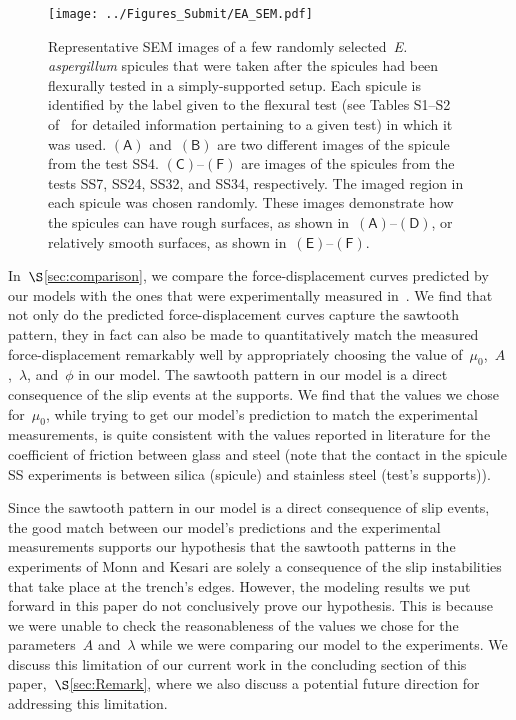 \documentclass[preprint,10pt,times]{elsarticle}
\numberwithin{equation}{section}
\newcommand{\pr}[1]{\left( #1 \right)}
\newcommand{\subf}[1]{\pr{\textsf{#1}}}
\begin{document}
\begin{figure}
\begin{centering}
\texttt{[image: ../Figures\_Submit/EA\_SEM.pdf]}
\par\end{centering}
\caption{
\label{fig:SEM}
Representative SEM images of a few
randomly selected~\textit{E. aspergillum} spicules that were taken after the spicules had been flexurally tested in a simply-supported setup. %
Each spicule is identified by the label given to the
flexural test (see Tables S1--S2 of~\cite{Sayaka2021Sawtooth} for detailed
information pertaining to a given test) in which it was used. %
$\subf{A}$ and~$\subf{B}$ are two
different images of the spicule from the test SS4. %
$\subf{C}$--$\subf{F}$ are images of
the spicules from the tests  SS7,
SS24, SS32, and SS34, respectively. %
The imaged region in each spicule was chosen randomly. %
These images demonstrate how the spicules can have rough
surfaces, as shown in~$\subf{A}$--$\subf{D}$, or relatively smooth
surfaces, as shown in~$\subf{E}$--$\subf{F}$. %
}
\end{figure}


In~$\S$\ref{sec:comparison}, we compare the force-displacement
curves predicted by our models with the ones that were experimentally
measured in~\cite{monn2017enhanced,Sayaka2021Sawtooth}. We find
that not only do the predicted force-displacement curves capture the
sawtooth pattern, they in fact can also be made to quantitatively
match the measured force-displacement remarkably well by appropriately
choosing the value of~$\mu_0$,~$A$,~$\lambda$, and~$\phi$
in our model. The sawtooth pattern in our model is a direct consequence
of the slip events at the supports. We find that the values we chose
for~$\mu_0$, while trying to get our model's prediction to match
the experimental measurements, is quite consistent with the values
reported in literature for the coefficient of friction between glass
and steel (note that the contact in the spicule SS experiments is
between silica (spicule) and stainless steel (test's supports)).

Since the sawtooth pattern in our model is a direct consequence of
slip events, the good match between our model's predictions and the
experimental measurements supports our hypothesis that the sawtooth
patterns in the experiments of Monn and Kesari are solely a consequence
of the slip instabilities that take place at the trench's edges. However,
the modeling results we put forward in this paper do not conclusively
prove our hypothesis. This is because we were unable to check the
reasonableness of the values we chose for the parameters~$A$ and~$\lambda$
while we were comparing our model to the experiments. We discuss this
limitation of our current work in the concluding section of this paper,~$\S$\ref{sec:Remark},
where we also discuss a potential future direction for addressing
this limitation.
\end{document}
